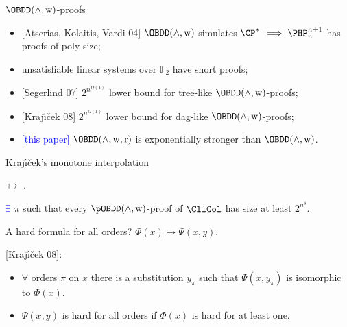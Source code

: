 \begin{frame}{$\OBDD(\land, \weakening)$-proofs}
    \begin{itemize}
        \item{} [Atserias, Kolaitis, Vardi 04] $\OBDD(\land, \weakening)$ simulates $\CP^*$
            \pause $\implies \PHP^{n + 1}_n$ has proofs of poly size;
        \pause
        \item{} unsatisfiable linear systems over $\mathbb{F}_2$ have short proofs;
        \pause
        \item{} [Segerlind 07] $2^{n^{\Omega(1)}}$ lower bound for tree-like $\OBDD(\land,
            \weakening)$-proofs;
        \pause
        \item{} [Kraj{\'{\i}}{\v{c}}ek 08] $2^{n^{\Omega(1)}}$ lower bound for dag-like $\OBDD(\land,
            \weakening)$-proofs;
        \pause
        \item{} \textcolor{blue}{[this paper]} $\OBDD(\land, \weakening,
            \reordering)$ is exponentially stronger than $\OBDD(\land, \weakening)$.
    \end{itemize}
\end{frame}

\begin{frame}{Kraj{\'{\i}}{\v{c}}ek's monotone interpolation}

     $\mapsto$
    .

    \pause

    \begin{theorem}[Kraj{\'{\i}}{\v{c}}ek 08]
        \textcolor{blue}{$\exists$} $\pi$ such that every $\pOBDD(\land,
        \weakening)$-proof of $\CliCol$ has size at least $2^{n^{\delta}}$.
    \end{theorem}

    \pause
    A hard formula for all orders? \pause $\Phi(x) \mapsto \Psi(x, y)$.

    \pause
    {[Kraj{\'{\i}}{\v{c}}ek 08]}:
    \begin{itemize}
        \item $\forall$ orders $\pi$ on $x$ there is a substitution $y_{\pi}$ such that $\Psi(x,
            y_{\pi})$ is isomorphic to $\Phi(x)$.
        \item $\Psi(x, y)$ is hard for all orders if $\Phi(x)$ is hard for at least one.
    \end{itemize}
\end{frame}

